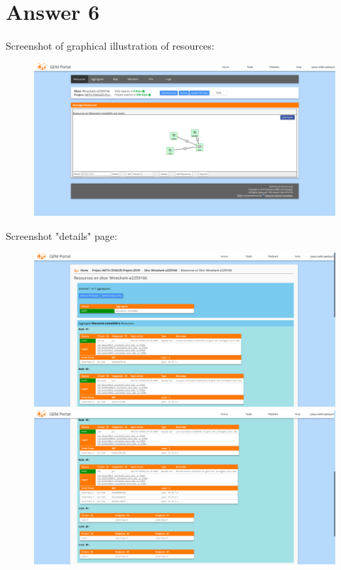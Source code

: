 \documentclass[10pt]{article}
\begin{document}
\section*{Answer 6}
\hspace{4mm}	
Screenshot of graphical illustration of resources: 

\begin{figure}[H]
    \centering
    \includegraphics[scale=0.2]{1.png}
\end{figure}

\newpage
Screenshot "details" page: 

\begin{figure}[H]
    \centering
    \includegraphics[scale=0.2]{2.png}
    \includegraphics[scale=0.2]{3.png}
\end{figure}
\end{document}

